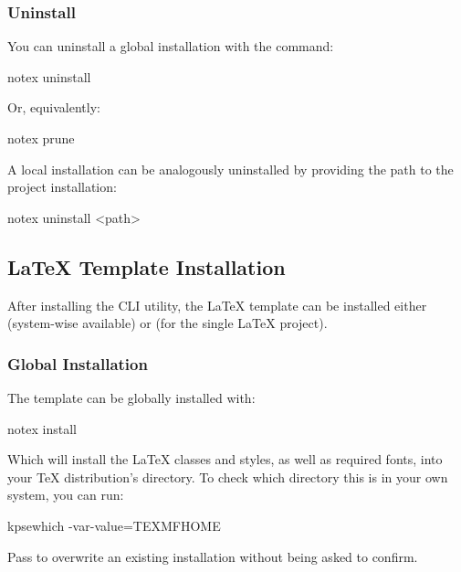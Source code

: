 \documentclass[../main.tex]{subfiles}
\begin{document}
\subsubsection{Uninstall}

You can uninstall a global  installation with the command:

\begin{bash}
    notex uninstall
\end{bash}

Or, equivalently:

\begin{bash}
    notex prune
\end{bash}

A local installation can be analogously uninstalled by providing the path to the project installation:

\begin{bash}
    notex uninstall <path>
\end{bash}

\subsection{LaTeX Template Installation}

After installing the  CLI utility, the LaTeX template can be installed either  (system-wise available) or  (for the single LaTeX project).

\subsubsection{Global Installation}

The template can be globally installed with:

\begin{bash}
    notex install
\end{bash}

Which will install the LaTeX classes and styles, as well as required fonts, into your TeX distribution's  directory. To check which directory this is in your own system, you can run:

\begin{bash}
    kpsewhich -var-value=TEXMFHOME
\end{bash}

\begin{info}
    Pass  to overwrite an existing installation without being asked to confirm.
\end{info}
\end{document}
